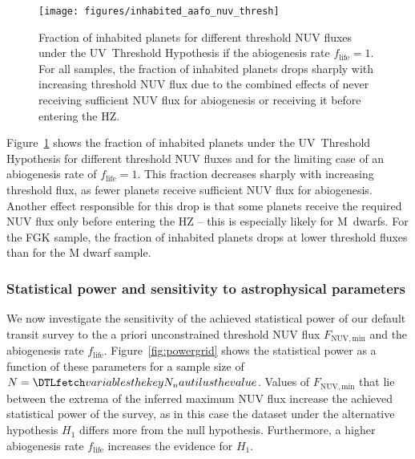 \documentclass[twocolumn,twocolappendix,linenumbers]{aastex631}
\begin{document}
\begin{figure}
    \begin{centering}
        \texttt{[image: figures/inhabited\_aafo\_nuv\_thresh]}
        \caption{Fraction of inhabited planets for different threshold \gls{NUV} fluxes under the UV~Threshold Hypothesis if the abiogenesis rate $f_\mathrm{life} = 1$.
        For all samples, the fraction of inhabited planets drops sharply with increasing threshold \gls{NUV} flux due to the combined effects of never receiving sufficient \gls{NUV} flux for abiogenesis or receiving it before entering the \gls{HZ}.}
        \label{fig:inhabited_aafo_nuv_thresh}
    \end{centering}
\end{figure}
Figure~\ref{fig:inhabited_aafo_nuv_thresh} shows the fraction of inhabited planets under the UV~Threshold Hypothesis for different threshold \gls{NUV} fluxes and for the limiting case of an abiogenesis rate of $f_\mathrm{life} = 1$.
This fraction decreases sharply with increasing threshold flux, as fewer planets receive sufficient \gls{NUV} flux for abiogenesis.
Another effect responsible for this drop is that some planets receive the required \gls{NUV} flux only before entering the \gls{HZ} -- this is especially likely for M~dwarfs.
For the FGK sample, the fraction of inhabited planets drops at lower threshold fluxes than for the M dwarf sample.


\subsubsection{Statistical power and sensitivity to astrophysical parameters}\label{sec:results-powergrid}
We now investigate the sensitivity of the achieved statistical power of our default transit survey to the a priori unconstrained threshold \gls{NUV} flux $F_\mathrm{NUV, min}$ and the abiogenesis rate $f_\mathrm{life}$.
Figure~\ref{fig:powergrid} shows the statistical power as a function of these parameters for a sample size of $N=\var{N_nautilus}$.
Values of $F_\mathrm{NUV, min}$ that lie between the extrema of the inferred maximum \gls{NUV} flux increase the achieved statistical power of the survey, as in this case the dataset under the alternative hypothesis $H_1$ differs more from the null hypothesis.
Furthermore, a higher abiogenesis rate $f_\mathrm{life}$ increases the evidence for $H_1$.
\end{document}
